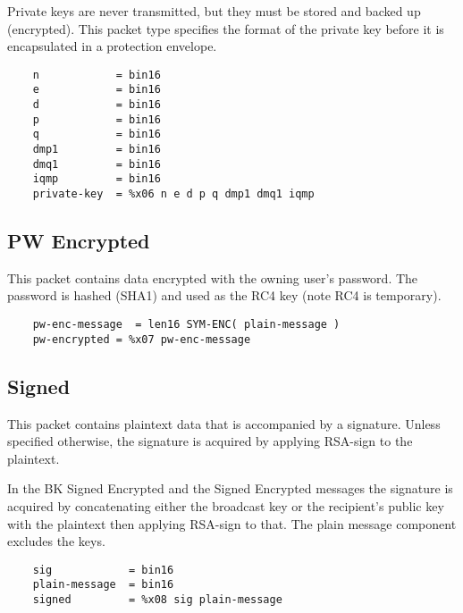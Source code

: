 \documentclass[letterpaper,11pt,oneside]{article}
\begin{document}
Private keys are never transmitted, but they must be stored and backed up
(encrypted). This packet type specifies the format of the private key before it
is encapsulated in a protection envelope.

\vspace{10pt}
\begin{verbatim}
    n            = bin16
    e            = bin16
    d            = bin16
    p            = bin16
    q            = bin16
    dmp1         = bin16
    dmq1         = bin16
    iqmp         = bin16
    private-key  = %x06 n e d p q dmp1 dmq1 iqmp
\end{verbatim}
\vspace{10pt}

\subsection{PW Encrypted}

This packet contains data encrypted with the owning user's password. The
password is hashed (SHA1) and used as the RC4 key (note RC4 is temporary).

\vspace{10pt}
\begin{verbatim}
    pw-enc-message  = len16 SYM-ENC( plain-message ) 
    pw-encrypted = %x07 pw-enc-message
\end{verbatim}
\vspace{10pt}

\subsection{Signed}
\label{signed-packet}

This packet contains plaintext data that is accompanied by a signature. Unless
specified otherwise, the signature is acquired by applying RSA-sign to the
plaintext. 

In the BK Signed Encrypted and the Signed Encrypted messages the
signature is acquired by concatenating either the broadcast key or the
recipient's public key with the plaintext then applying RSA-sign to that. The
plain message component excludes the keys.

\vspace{10pt}
\begin{verbatim}
    sig            = bin16
    plain-message  = bin16
    signed         = %x08 sig plain-message
\end{verbatim}
\vspace{10pt}
\end{document}
